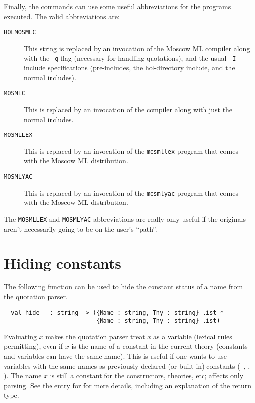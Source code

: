 Finally, the commands can use some useful abbreviations for the
programs executed.  The valid abbreviations are:
\begin{description}
\item[\texttt{HOLMOSMLC}] This string is replaced by an
invocation of the Moscow ML compiler along with the \texttt{-q} flag
(necessary for handling quotations), and the usual \texttt{-I} include
specifications (pre-includes, the hol-directory include, and the
normal includes).
\item[\texttt{MOSMLC}] This is replaced by an invocation of the
  compiler along with just the normal includes.
\item[\texttt{MOSMLLEX}] This is replaced by an invocation of the
  \texttt{mosmllex} program that comes with the Moscow ML
  distribution.
\item[\texttt{MOSMLYAC}] This is replaced by an invocation of the
  \texttt{mosmlyac} program that comes with the Moscow ML
  distribution.
\end{description}
The \texttt{MOSMLLEX} and \texttt{MOSMLYAC} abbreviations are really
only useful if the originals aren't necessarily going to be on the
user's ``path''.

\section{Hiding constants}
\label{hidden}

The following function can be used to hide the constant  status of  a name from
the quotation parser.

\begin{boxed}
\begin{verbatim}
  val hide   : string -> ({Name : string, Thy : string} list *
                          {Name : string, Thy : string} list)
\end{verbatim}\end{boxed}

\noindent Evaluating $x$
makes the quotation parser treat $x$ as a variable (lexical
rules permitting), even if $x$ is the name of a constant in the current theory
(constants and variables can have the same name).
This is useful if one wants to use variables  with the same names
as previously declared (or built-in) constants (\eg\ , , 
\etc).
The name $x$ is still a
constant for the constructors, theories, etc; 
affects only  parsing.  See the \REFERENCE{} entry for  for
more details, including an explanation of the return type.

